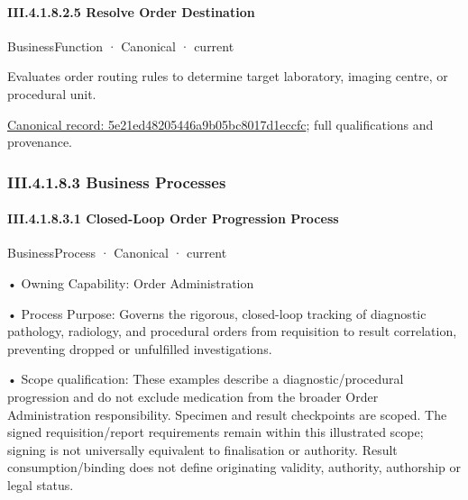 \paragraph*{III.4.1.8.2.5 Resolve Order Destination}
\label{navigation:III.4.1.8.2.5}

\label{element:5e21ed48205446a9b05bc8017d1eccfc}
{\small BusinessFunction · Canonical · current}\par

Evaluates order routing rules to determine target laboratory, imaging centre, or procedural unit.


{\footnotesize \href{../../../../../../../continuum/business/business-function/5e21ed48205446a9b05bc8017d1eccfc.md}{Canonical record: 5e21ed48205446a9b05bc8017d1eccfc}; full qualifications and provenance.}\par
\subsubsection*{III.4.1.8.3 Business Processes}
\label{navigation:III.4.1.8.3}

\paragraph*{III.4.1.8.3.1 Closed-Loop Order Progression Process}
\label{navigation:III.4.1.8.3.1}

\label{element:e19a7c9594a4401e92450e4c31598982}
{\small BusinessProcess · Canonical · current}\par

•
Owning Capability: Order Administration



•
Process Purpose: Governs the rigorous, closed-loop tracking of diagnostic pathology, radiology, and procedural orders from requisition to result correlation, preventing dropped or unfulfilled investigations.



•
Scope qualification: These examples describe a diagnostic/procedural progression and do not exclude medication from the broader Order Administration responsibility. Specimen and result checkpoints are scoped. The signed requisition/report requirements remain within this illustrated scope; signing is not universally equivalent to finalisation or authority. Result consumption/binding does not define originating validity, authority, authorship or legal status.




